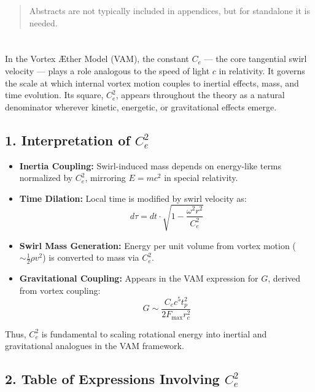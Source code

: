 \documentclass[12pt]{article}
\begin{document}
  \titlepageOpen

  \begin{abstract}
      Abstracts are not typically included in appendices, but for standalone it is needed.
  \end{abstract}

  \titlepageClose
\fi


\section{\papertitle}
In the Vortex Æther Model (VAM), the constant \( C_e \) --- the core tangential swirl velocity --- plays a role analogous to the speed of light \( c \) in relativity. It governs the scale at which internal vortex motion couples to inertial effects, mass, and time evolution. Its square, \( C_e^2 \), appears throughout the theory as a natural denominator wherever kinetic, energetic, or gravitational effects emerge.

\subsection*{1. Interpretation of \( C_e^2 \)}

\begin{itemize}
    \item \textbf{Inertia Coupling:} Swirl-induced mass depends on energy-like terms normalized by \( C_e^2 \), mirroring \( E = mc^2 \) in special relativity.
    \item \textbf{Time Dilation:} Local time is modified by swirl velocity as:
    \[ d\tau = dt \cdot \sqrt{1 - \frac{\omega^2 r^2}{C_e^2}} \]

    \item \textbf{Swirl Mass Generation:} Energy per unit volume from vortex motion (\( \sim \frac{1}{2} \rho v^2 \)) is converted to mass via \( C_e^2 \).

    \item \textbf{Gravitational Coupling:} Appears in the VAM expression for \( G \), derived from vortex coupling:
    \[ G \sim \frac{C_e c^5 t_p^2}{2 F_{\text{max}} r_c^2} \]
\end{itemize}

Thus, \( C_e^2 \) is fundamental to scaling rotational energy into inertial and gravitational analogues in the VAM framework.

\subsection*{2. Table of Expressions Involving \( C_e^2 \)}
\end{document}

